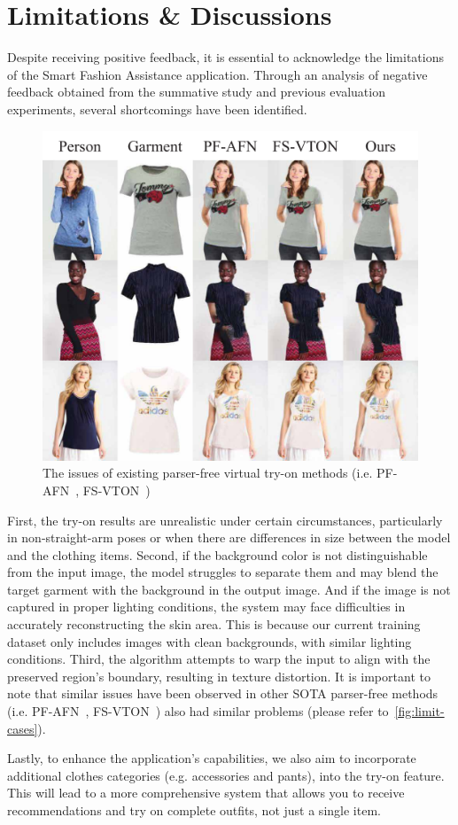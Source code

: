 \section{Limitations \& Discussions}
Despite receiving positive feedback, it is essential to acknowledge the limitations of the Smart Fashion Assistance application. Through an analysis of negative feedback obtained from the summative study and previous evaluation experiments, several shortcomings have been identified.

\begin{figure}[h!]
    \centering
    \includegraphics[width=0.7\linewidth]{content/resources/images/application/limit-cases.pdf}
    \caption{The issues of existing parser-free virtual try-on methods (i.e. PF-AFN~\cite{Ge-CVPR2021-Parser}, FS-VTON~\cite{He-CVPR2022-Style})}
    \label{fig:limit-cases}
\end{figure}

First, the try-on results are unrealistic under certain circumstances, particularly in non-straight-arm poses or when there are differences in size between the model and the clothing items.
Second, if the background color is not distinguishable from the input image, the model struggles to separate them and may blend the target garment with the background in the output image. And if the image is not captured in proper lighting conditions, the system may face difficulties in accurately reconstructing the skin area. This is because our current training dataset only includes images with clean backgrounds, with similar lighting conditions. Third, the algorithm attempts to warp the input to align with the preserved region's boundary, resulting in texture distortion.
It is important to note that similar issues have been observed in other SOTA parser-free methods (i.e. PF-AFN~\cite{Ge-CVPR2021-Parser}, FS-VTON~\cite{He-CVPR2022-Style}) also had similar problems (please refer to~\autoref{fig:limit-cases}). 

Lastly, to enhance the application's capabilities, we also aim to incorporate additional clothes categories (e.g. accessories and pants), into the try-on feature. This will lead to a more comprehensive system that allows you to receive recommendations and try on complete outfits, not just a single item.
